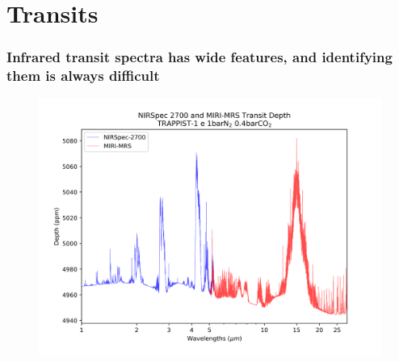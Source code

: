 \documentclass{beamer}
\begin{document}
\section{Transits}


\begin{frame}
    \frametitle{Infrared transit spectra has wide features, and identifying them
    is always difficult}
    \begin{figure}
        \includegraphics[height=0.8\textheight]{spectra/miri_nirspec_depth.png}
    \end{figure}
\end{frame}
\end{document}
